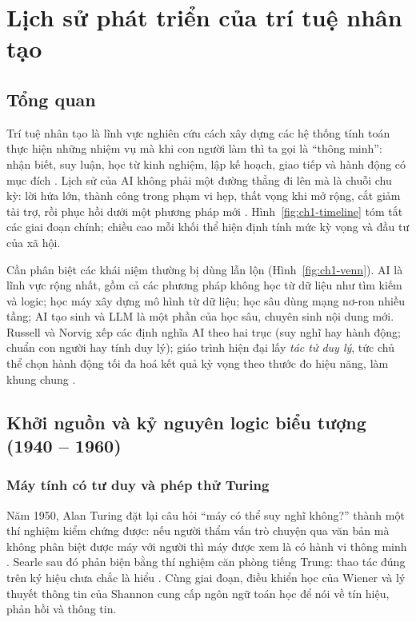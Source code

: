 \chapter{Lịch sử phát triển của trí tuệ nhân tạo}\label{chap:lichsu}

\section{Tổng quan}
Trí tuệ nhân tạo là lĩnh vực nghiên cứu cách xây dựng các hệ thống tính toán thực hiện những nhiệm vụ mà khi con người làm thì ta gọi là
``thông minh'': nhận biết, suy luận, học từ kinh nghiệm, lập kế hoạch, giao tiếp và hành động có mục đích \cite{ch1:russell2021}.
Lịch sử của AI không phải một đường thẳng đi lên mà là chuỗi chu kỳ: lời hứa lớn, thành công trong phạm vi hẹp, thất vọng khi mở
rộng, cắt giảm tài trợ, rồi phục hồi dưới một phương pháp mới \cite{ch1:nilsson2010}. Hình~\ref{fig:ch1-timeline} tóm tắt các giai
đoạn chính; chiều cao mỗi khối thể hiện định tính mức kỳ vọng và đầu tư của xã hội.


Cần phân biệt các khái niệm thường bị dùng lẫn lộn (Hình~\ref{fig:ch1-venn}). AI là lĩnh vực rộng nhất, gồm cả các phương pháp không
học từ dữ liệu như tìm kiếm và logic; học máy xây dựng mô hình từ dữ liệu; học sâu dùng mạng nơ-ron nhiều tầng; AI tạo sinh và LLM
là một phần của học sâu, chuyên sinh nội dung mới. Russell và Norvig xếp các định nghĩa AI theo hai trục (suy nghĩ hay hành động;
chuẩn con người hay tính duy lý); giáo trình hiện đại lấy \emph{tác tử duy lý}, tức chủ thể chọn hành động tối đa hoá kết quả kỳ
vọng theo thước đo hiệu năng, làm khung chung \cite{ch1:russell2021}.


\section{Khởi nguồn và kỷ nguyên logic biểu tượng (1940 -- 1960)}
\subsection{Máy tính có tư duy và phép thử Turing}
Năm 1950, Alan Turing đặt lại câu hỏi ``máy có thể suy nghĩ không?'' thành một thí nghiệm kiểm chứng được: nếu người thẩm vấn trò
chuyện qua văn bản mà không phân biệt được máy với người thì máy được xem là có hành vi thông minh \cite{ch1:turing1950}. Searle sau
đó phản biện bằng thí nghiệm căn phòng tiếng Trung: thao tác đúng trên ký hiệu chưa chắc là hiểu \cite{ch1:searle1980}. Cùng giai đoạn,
điều khiển học của Wiener \cite{ch1:wiener1948} và lý thuyết thông tin của Shannon \cite{ch1:shannon1948} cung cấp ngôn ngữ toán học để
nói về tín hiệu, phản hồi và thông tin.

